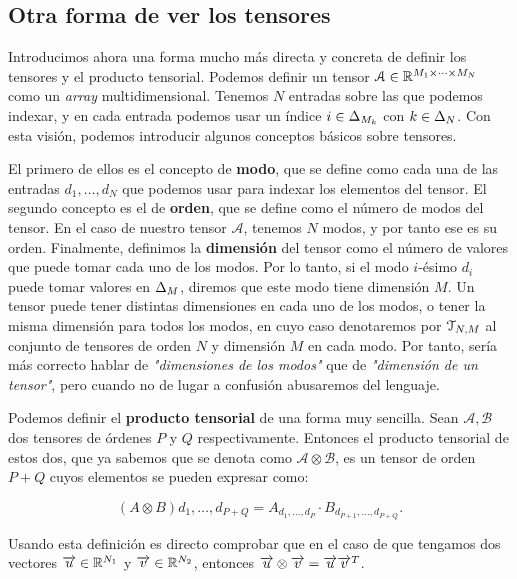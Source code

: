 \subsection{Otra forma de ver los tensores} \label{sec:otra_forma_tensores}

Introducimos ahora una forma mucho más directa y concreta de definir los tensores y el producto tensorial. Podemos definir un tensor $\mathcal{A} \in \mathbb{R}^{M_1 \times \cdots \times M_N}$ como un \textit{array} multidimensional. Tenemos $N$ entradas sobre las que podemos indexar, y en cada entrada podemos usar un índice $i \in \Delta_{M_k}$ con $k \in \Delta_{N}$. Con esta visión, podemos introducir algunos conceptos básicos sobre tensores.

El primero de ellos es el concepto de \textbf{modo}, que se define como cada una de las entradas $d_1, \ldots, d_N$ que podemos usar para indexar los elementos del tensor. El segundo concepto es el de \textbf{orden}, que se define como el número de modos del tensor. En el caso de nuestro tensor $\mathcal{A}$, tenemos $N$ modos, y por tanto ese es su orden. Finalmente, definimos la \textbf{dimensión} del tensor como el número de valores que puede tomar cada uno de los modos. Por lo tanto, si el modo $i$-ésimo $d_i$ puede tomar valores en $\Delta_{M}$, diremos que este modo tiene dimensión $M$. Un tensor puede tener distintas dimensiones en cada uno de los modos, o tener la misma dimensión para todos los modos, en cuyo caso denotaremos por $\mathcal{T}_{N, M}$ al conjunto de tensores de orden $N$ y dimensión $M$ en cada modo. Por tanto, sería más correcto hablar de \textit{"dimensiones de los modos"} que de \textit{"dimensión de un tensor"}, pero cuando no de lugar a confusión abusaremos del lenguaje.

Podemos definir el \textbf{producto tensorial} de una forma muy sencilla. Sean $\mathcal{A}, \mathcal{B}$ dos tensores de órdenes $P$ y $Q$ respectivamente. Entonces el producto tensorial de estos dos, que ya sabemos que se denota como $\mathcal{A} \otimes \mathcal{B}$, es un tensor de orden $P + Q$ cuyos elementos se pueden expresar como:

$$(A \otimes B)d_1, \ldots, d_{P + Q} = A_{d_1, \ldots, d_P} \cdot B_{d_{P + 1}, \ldots, d_{P + Q}}.$$

\begin{observacion}
    Usando esta definición es directo comprobar que en el caso de que tengamos dos vectores $\overrightarrow{u} \in \mathbb{R}^{N_1}$ y $\overrightarrow{v} \in \mathbb{R}^{N_2}$, entonces $\overrightarrow{u} \otimes \overrightarrow{v} = \overrightarrow{u} \overrightarrow{v}^T$.
\end{observacion}

